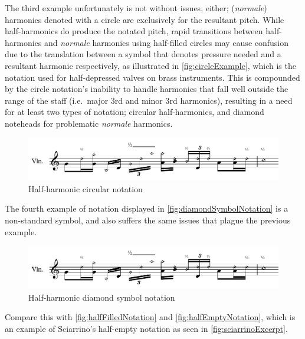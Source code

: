 The third example unfortunately is not without issues, either; (\emph{normale}) harmonics denoted with a circle are exclusively for the resultant pitch.\autocite[419]{gouldBars2011} 
While half-harmonics do produce the notated pitch, rapid transitions between half-harmonics and \emph{normale} harmonics using half-filled circles may cause confusion due to the translation between a symbol that denotes pressure needed and a resultant harmonic respectively, as illustrated in \autoref{fig:circleExample}, which is the notation used for half-depressed valves on brass instruments.\autocite[85]{cherryExtendedTechniquesTrumpet2009}
This is compounded by the circle notation's inability to handle harmonics that fall well outside the range of the staff (i.e.\ major 3rd and minor 3rd harmonics), resulting in a need for at least two types of notation; circular half-harmonics, and diamond noteheads for problematic \emph{normale} harmonics.

\begin{figure}
    \includegraphics[page=3,width=\textwidth]{resources/halfHarmonicsSingleExamples.pdf}
    \caption{Half-harmonic circular notation}\label{fig:circleExample}
  \end{figure}

The fourth example of notation displayed in \autoref{fig:diamondSymbolNotation} is a non-standard symbol, and also suffers the same issues that plague the previous example.

\begin{figure}
  \includegraphics[page=4,width=\textwidth]{resources/halfHarmonicsSingleExamples.pdf}
  \caption{Half-harmonic diamond symbol notation}\label{fig:diamondSymbolNotation}
\end{figure}


Compare this with \autoref{fig:halfFilledNotation} and \autoref{fig:halfEmptyNotation}, which is an example of Sciarrino's half-empty notation as seen in \autoref{fig:sciarrinoExcerpt}.

